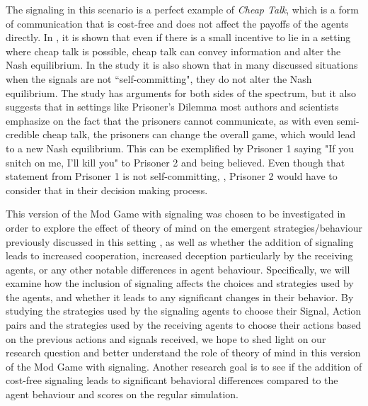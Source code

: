 The signaling in this scenario is a perfect example of \textit{Cheap Talk}, which is a form of communication that is cost-free and does not affect the payoffs of the agents directly. In \cite{farrell1996cheap}, it is shown that even if there is a small incentive to lie in a setting where cheap talk is possible, cheap talk can convey information and alter the Nash equilibrium. In the study it is also shown that in many discussed situations when the signals are not ``self-committing", they do not alter the Nash equilibrium. The study has arguments for both sides of the spectrum, but it also suggests that in settings like Prisoner's Dilemma \citep{kuhn1997prisoner} most authors and scientists emphasize on the fact that the prisoners cannot communicate, as with even semi-credible cheap talk, the prisoners can change the overall game, which would lead to a new Nash equilibrium. This can be exemplified by Prisoner 1 saying "If you snitch on me, I'll kill you" to Prisoner 2 and being believed. Even though that statement from Prisoner 1 is not self-committing, \citep{osborne1994course}, Prisoner 2 would have to consider that in their decision making process.

This version of the Mod Game with signaling was chosen to be investigated in order to explore the effect of theory of mind on the emergent strategies/behaviour previously discussed in this setting \citep{veltman2019training}, as well as whether the addition of signaling leads to increased cooperation, increased deception particularly by the receiving agents, or any other notable differences in agent behaviour. Specifically, we will examine how the inclusion of signaling affects the choices and strategies used by the agents, and whether it leads to any significant changes in their behavior. By studying the strategies used by the signaling agents to choose their {Signal, Action} pairs and the strategies used by the receiving agents to choose their actions based on the previous actions and signals received, we hope to shed light on our research question and better understand the role of theory of mind in this version of the Mod Game with signaling. Another research goal is to see if the addition of cost-free signaling leads to significant behavioral differences compared to the agent behaviour and scores on the regular simulation.  